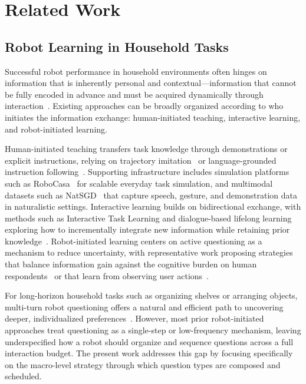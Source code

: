 \documentclass[manuscript,review,anonymous]{acmart}
\begin{document}
\section{Related Work}
\label{sec:related}

\subsection{Robot Learning in Household Tasks}
\label{sec:related:household}

Successful robot performance in household environments often hinges on information that is inherently personal and contextual---information that cannot be fully encoded in advance and must be acquired dynamically through interaction~\cite{zhong2021gap}. Existing approaches can be broadly organized according to who initiates the information exchange: human-initiated teaching, interactive learning, and robot-initiated learning.

Human-initiated teaching transfers task knowledge through demonstrations or explicit instructions, relying on trajectory imitation~\cite{tsuji2025survey,hussein2017imitation,wake2024gpt} or language-grounded instruction following~\cite{she2014teaching}. Supporting infrastructure includes simulation platforms such as RoboCasa~\cite{nasiriany2024robocasa} for scalable everyday task simulation, and multimodal datasets such as NatSGD~\cite{shrestha2024natsgd} that capture speech, gesture, and demonstration data in naturalistic settings. Interactive learning builds on bidirectional exchange, with methods such as Interactive Task Learning and dialogue-based lifelong learning exploring how to incrementally integrate new information while retaining prior knowledge~\cite{tyshka2023interactive,reimann2024survey,schmidt2018survey,luo2019learning,zheng2019personalized,lawley2024val}. Robot-initiated learning centers on active questioning as a mechanism to reduce uncertainty, with representative work proposing strategies that balance information gain against the cognitive burden on human respondents~\cite{habibian2022here,biyik2019asking} or that learn from observing user actions~\cite{wu2023tidybot}.

For long-horizon household tasks such as organizing shelves or arranging objects, multi-turn robot questioning offers a natural and efficient path to uncovering deeper, individualized preferences~\cite{hunt2024survey}. However, most prior robot-initiated approaches treat questioning as a single-step or low-frequency mechanism, leaving underspecified how a robot should organize and sequence questions across a full interaction budget. The present work addresses this gap by focusing specifically on the macro-level strategy through which question types are composed and scheduled.
\end{document}
